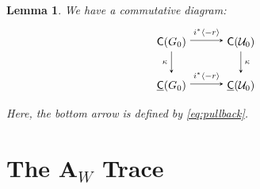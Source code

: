 \documentclass[a4paper,10pt,leqno]{amsart}
\theoremstyle{plain}
\theoremstyle{plain}
\theoremstyle{plain}
\newtheorem{lem}[thm]{Lemma}
\theoremstyle{definition}
\theoremstyle{remark}
\begin{document}
\begin{lem}\label{lem:pullback-kappa}
We have a commutative diagram:
\begin{equation}
\begin{tikzpicture}[baseline=(current bounding box.center), >=stealth]
\matrix(m)[matrix of math nodes, row sep=2em, column sep=3em, text height=2.5ex, text depth=0.5ex]
{	\sf{C}(G_0)
		&\sf{C}(\cal{U}_0)\\
	\underline{\sf{C}}(G_0)
		&\underline{\sf{C}}(\cal{U}_0)\\
		};
\path[->,font=\scriptsize, auto]
(m-1-1)		edge node{$i^\ast\langle -r\rangle$} (m-1-2)
(m-1-1)		edge node[left]{$\kappa$} (m-2-1)
(m-1-2)		edge node{$\kappa$} (m-2-2)
(m-2-1)		edge node{$i^\ast\langle -r\rangle$} (m-2-2);
\end{tikzpicture}
\end{equation}
Here, the bottom arrow is defined by \eqref{eq:pullback}.
\end{lem}

\newpage
\section{The $\mathbf{A}_W$ Trace}\label{sec:a_w}

\subsection{}
\end{document}
